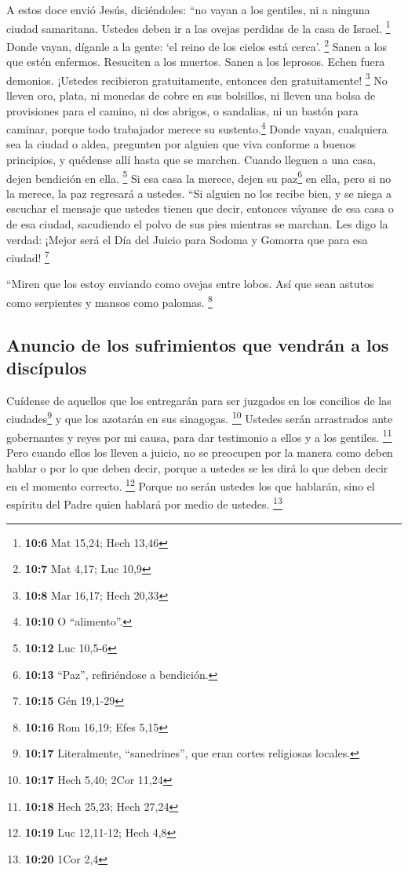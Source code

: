  A estos doce envió Jesús, diciéndoles: ``no vayan a los
gentiles, ni a ninguna ciudad samaritana.  Ustedes deben
ir a las ovejas perdidas de la casa de Israel. \footnote{\textbf{10:6}
  Mat 15,24; Hech 13,46}  Donde vayan, díganle a la gente:
`el reino de los cielos está cerca'. \footnote{\textbf{10:7} Mat 4,17;
  Luc 10,9}  Sanen a los que estén enfermos. Resuciten a
los muertos. Sanen a los leprosos. Echen fuera demonios. ¡Ustedes
recibieron gratuitamente, entonces den gratuitamente! \footnote{\textbf{10:8}
  Mar 16,17; Hech 20,33}  No lleven oro, plata, ni monedas
de cobre en sus bolsillos,  ni lleven una bolsa de
provisiones para el camino, ni dos abrigos, o sandalias, ni un bastón
para caminar, porque todo trabajador merece su sustento.\footnote{\textbf{10:10}
  O ``alimento''.}  Donde vayan, cualquiera sea la ciudad
o aldea, pregunten por alguien que viva conforme a buenos principios, y
quédense allí hasta que se marchen.  Cuando lleguen a una
casa, dejen bendición en ella. \footnote{\textbf{10:12} Luc 10,5-6}
 Si esa casa la merece, dejen su paz\footnote{\textbf{10:13}
  ``Paz'', refiriéndose a bendición.} en ella, pero si no la merece, la
paz regresará a ustedes.  ``Si alguien no los recibe
bien, y se niega a escuchar el mensaje que ustedes tienen que decir,
entonces váyanse de esa casa o de esa ciudad, sacudiendo el polvo de sus
pies mientras se marchan.  Les digo la verdad: ¡Mejor
será el Día del Juicio para Sodoma y Gomorra que para esa ciudad!
\footnote{\textbf{10:15} Gén 19,1-29}

 ``Miren que los estoy enviando como ovejas entre lobos.
Así que sean astutos como serpientes y mansos como palomas. \footnote{\textbf{10:16}
  Rom 16,19; Efes 5,15}

\hypertarget{anuncio-de-los-sufrimientos-que-vendruxe1n-a-los-discuxedpulos}{%
\subsection{Anuncio de los sufrimientos que vendrán a los
discípulos}\label{anuncio-de-los-sufrimientos-que-vendruxe1n-a-los-discuxedpulos}}

 Cuídense de aquellos que los entregarán para ser
juzgados en los concilios de las ciudades\footnote{\textbf{10:17}
  Literalmente, ``sanedrines'', que eran cortes religiosas locales.} y
que los azotarán en sus sinagogas. \footnote{\textbf{10:17} Hech 5,40;
  2Cor 11,24}  Ustedes serán arrastrados ante gobernantes
y reyes por mi causa, para dar testimonio a ellos y a los gentiles.
\footnote{\textbf{10:18} Hech 25,23; Hech 27,24}  Pero
cuando ellos los lleven a juicio, no se preocupen por la manera como
deben hablar o por lo que deben decir, porque a ustedes se les dirá lo
que deben decir en el momento correcto. \footnote{\textbf{10:19} Luc
  12,11-12; Hech 4,8}  Porque no serán ustedes los que
hablarán, sino el espíritu del Padre quien hablará por medio de ustedes.
\footnote{\textbf{10:20} 1Cor 2,4}

